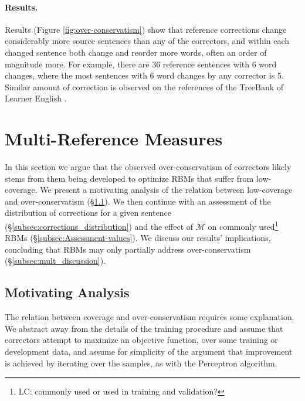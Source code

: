 \documentclass[letterpaper, 11pt]{article}
\newcommand{\lc}[1]{\footnote{\color{blue}LC: #1}}
\begin{document}
\paragraph{Results.}
Results (Figure \ref{fig:over-conservatism}) show that reference corrections change considerably more source sentences than any of the correctors, and within each changed sentence both change and reorder more words, often an order of magnitude more. For example, there are  36 reference sentences with 6 word changes, where the most sentences with 6 word changes by any corrector is 5.
Similar amount of correction is observed on the references of the TreeBank of Learner English \cite{yannakoudakis2011new}.
%
%
\vspace{-.1cm}
\section{Multi-Reference Measures}\label{sec:increase-reference}
%
In this section we argue that the observed over-conservatism of correctors likely stems
from them being developed to optimize RBMs that suffer from low-coverage.
We present a motivating analysis of the relation between low-coverage and over-conservatism (\S \ref{subsec:motivating_analysis}). We then continue with an assessment of the distribution of corrections for a given sentence (\S \ref{subsec:corrections_distribution})
and the effect of $\mathcal{M}$ on commonly used\lc{commonly used or used in training and validation?} RBMs (\S \ref{subsec:Assessment-values}).
We discuss our results' implications, concluding that RBMs may only partially address over-conservatism (\S \ref{subsec:mult_discussion}).
%
\vspace{-.2cm}
\subsection{Motivating Analysis}\label{subsec:motivating_analysis}
%
The relation between coverage and over-conservatism requires some explanation.
We abstract away from the details of the training procedure and assume that correctors attempt to maximize an objective function, over some training or development data, and assume for simplicity of the argument that improvement is achieved by iterating over the samples, as with the Perceptron algorithm.
\end{document}
